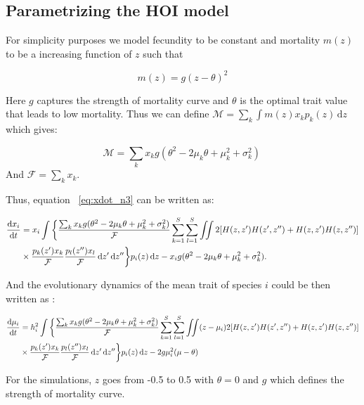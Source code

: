 \documentclass[11pt]{article}
\newcommand{\ud}{\text{d}}
\let\originalleft\left
\let\originalright\right
\renewcommand{\left}{\mathopen{}\mathclose\bgroup\originalleft}
\renewcommand{\right}{\aftergroup\egroup\originalright}
\begin{document}
\subsection{Parametrizing the HOI model}

 For simplicity purposes we model fecundity to be constant and mortality $m(z)$ to be a increasing function of $z$ such that 

\begin{equation}
\label{eq:mort}
m(z) = g(z-\theta)^2 
\end{equation}

Here $g$ captures the strength of mortality curve and $\theta$ is the optimal trait value that leads to low mortality. Thus we can define $\mathcal{M} = \sum_k \int m(z) x_k p_k(z) \,\ud z$ which gives:

\begin{equation}
\label{eq:Mort}
\mathcal{M} = \sum_k x_k g (\theta^2- 2\mu_{k}\theta+ \mu_{k}^2+ \sigma_{k}^2) \, 
\end{equation}
And $ \mathcal{F} = \sum_k x_k$.

Thus, equation ~\ref{eq:xdot_n3} can be written as:

\begin{equation}
\label{eq:xdot_n4}
\begin{split}
\frac{\ud x_i}{\ud t} &= x_i \int\bigg\{\frac{ \sum_k x_k g (\theta^2- 2\mu_{k}\theta+ \mu_{k}^2+ \sigma_{k}^2) }{\mathcal{F}}
\sum_{k=1}^S \sum_{l=1}^S \iint 2 \left[ H(z,z')H(z',z'') + H(z,z')H(z,z'')
\right] \\ &\times \frac{ p_k(z') x_k}{\mathcal{F}}
\frac{p_l(z'') x_l}{\mathcal{F}} \,\ud z' \,\ud z'' \bigg\} p_i(z) \,\ud z - 
 x_{i} g (\theta^2- 2\mu_{k}\theta+ \mu_{k}^2+ \sigma_{k}^2).
\end{split}
\end{equation}



And the evolutionary dynamics of the mean trait of species $i$ could be then written as :

\begin{equation}
\label{eq:xdot_n5}
\begin{split}
 \frac{\ud \mu_i}{\ud t} &=  h_i^2 \int\bigg\{\frac{ \sum_k x_k g (\theta^2- 2\mu_{k}\theta+ \mu_{k}^2+ \sigma_{k}^2) }{\mathcal{F}}
\sum_{k=1}^S \sum_{l=1}^S \iint (z-\mu_{i} ) 2 \left[ H(z,z')H(z',z'') + H(z,z')H(z,z'')
\right] \\ &\times \frac{ p_k(z') x_k}{\mathcal{F}}
\frac{p_l(z'') x_l}{\mathcal{F}} \,\ud z' \,\ud z''\bigg\} p_i(z) \,\ud z - 
 2 g \mu_{i}^2 (\mu- \theta )
\end{split}
\end{equation}	

For the simulations, $z$ goes from -0.5 to 0.5 with $\theta = 0 $ and $g$ which defines the strength of mortality curve.




\end{document}
